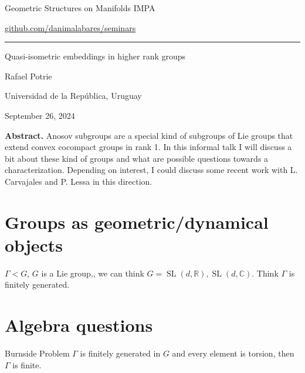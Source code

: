 


\begin{minipage}{\textwidth}
	\begin{minipage}{1\textwidth}
		Geometric Structures on Manifolds \hfill IMPA
		
		{\small\hfill\href{https://github.com/danimalabares/seminars}{github.com/danimalabares/seminars}}

		
	\end{minipage}
\end{minipage}\vspace{.2cm}\hrule

\vspace{10pt}

{\Huge  Quasi-isometric embeddings in higher rank groups}

\hfill{\Large Rafael Potrie}

{\Large \hfill Universidad de la República, Uruguay}

\hfill{\large September 26, 2024}

{\color{6}\bfseries Abstract.}\hspace{.5em} Anosov subgroups are a special kind of subgroups of Lie groups that extend convex cocompact groups in rank 1. In this informal talk I will discuss a bit about these kind of groups and what are possible questions towards a characterization. Depending on interest, I could discuss some recent work with L. Carvajales and P. Lessa in this direction.

\tableofcontents

\section{Groups as geometric/dynamical objects}

$\Gamma<G$, $G$ is a Lie group,, we can think $G=\operatorname{SL}(d,\mathbb{R}),\operatorname{SL}(d,\mathbb{C})$. Think $\Gamma$ is finitely generated.

\section{Algebra questions}

\begin{idea2}{Burnside Problem}\leavevmode
	$\Gamma$ is finitely generated in $ G$ and every element is torsion, then $\Gamma$ is finite.
\end{idea2}


